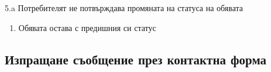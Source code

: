 \documentclass[a4paper]{article}
\begin{document}
\begin{usecase}
{\begin{enumerate}[1.]
                \end{enumerate} 
        \item[5.a] Потребителят не потвърждава промяната на статуса на обявата
                \begin{enumerate}[1.]
                \item Обявата остава с предишния си статус
                \end{enumerate}
}                
\end{usecase}

\subsection{Изпращане съобщение през контактна форма} %
\end{document}
